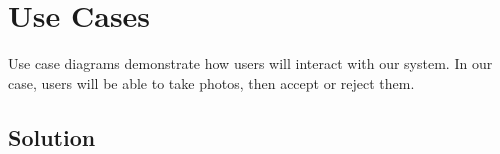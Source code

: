 \chapter{Use Cases}


Use case diagrams demonstrate how users will interact with our system. In our case, users will be able to take photos, then accept or reject them. 


\section{Solution}
